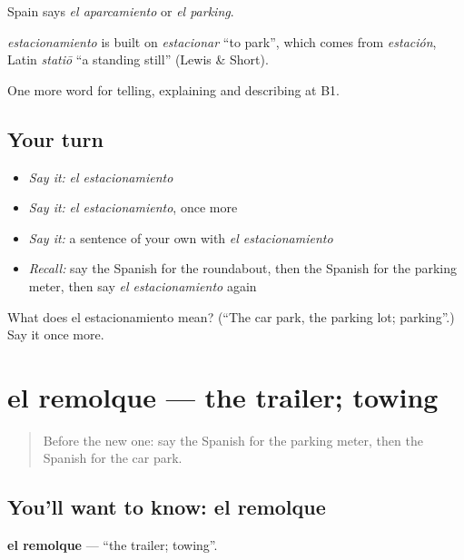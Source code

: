 Spain says \emph{el aparcamiento} or \emph{el parking}.

\begin{cousinweb}
\emph{estacionamiento} is built on \emph{estacionar} \textquotedblleft{}to park\textquotedblright{}, which comes from \emph{estación}, Latin \emph{statiō} \textquotedblleft{}a standing still\textquotedblright{} (Lewis \& Short).
\end{cousinweb}

\begin{grammarlens}[title={What you've built}]
One more word for telling, explaining and describing at B1.
\end{grammarlens}

\subsection*{Your turn}
\begin{itemize}
\raggedright
  \item \emph{Say it:} \emph{el estacionamiento}
  \item \emph{Say it:} \emph{el estacionamiento}, once more
  \item \emph{Say it:} a sentence of your own with \emph{el estacionamiento}
  \item \emph{Recall:} say the Spanish for the roundabout, then the Spanish for the parking meter, then say \emph{el estacionamiento} again
\end{itemize}

\begin{tcolorbox}[breakable,colback=teal!4,colframe=teal!35!black,title={Before you move on}]
What does el estacionamiento mean? (\textquotedblleft{}The car park, the parking lot; parking\textquotedblright{}.) Say it once more.
\end{tcolorbox}
\section[el remolque]{el remolque — the trailer; towing}

\label{lesson:ES-C648-remolque}



\begin{quote}
Before the new one: say the Spanish for the parking meter, then the Spanish for the car park.
\end{quote}

\subsection*{You'll want to know: el remolque}
\textbf{el remolque} — \textquotedblleft{}the trailer; towing\textquotedblright{}.

